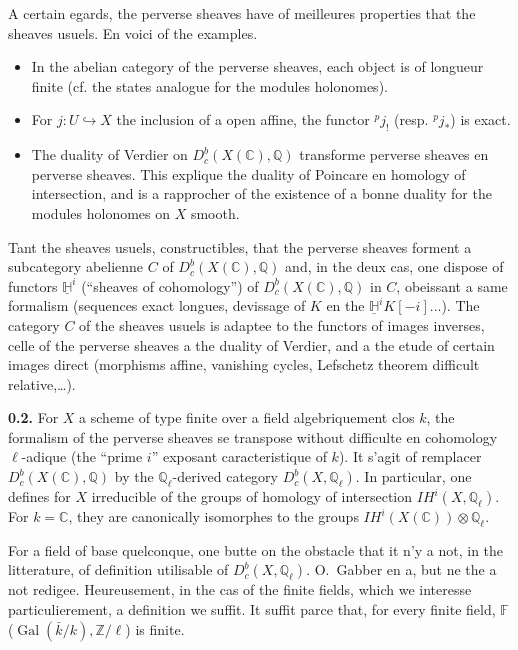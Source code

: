 \documentclass[12pt,a4paper]{article}
\theoremstyle{plain}
\theoremstyle{definition}
\theoremstyle{remark}
\DeclareMathOperator{\Gal}{Gal}
\newcommand{\IH}{\mathit{IH}}
\newcommand{\HH}{\mathbb{H}}
\newcommand{\CC}{\mathbb{C}}
\newcommand{\QQ}{\mathbb{Q}}
\newcommand{\ZZ}{\mathbb{Z}}
\newcommand{\FF}{\mathbb{F}}
\begin{document}
A certain egards, the perverse sheaves have of meilleures properties that the sheaves usuels. En voici of the examples.

\begin{itemize}
\item In the abelian category of the perverse sheaves, each object is of longueur finite (cf. the states analogue for the modules holonomes).
\item For $j : U \hookrightarrow X$ the inclusion of a open affine, the functor ${}^{p}j_{!}$ (resp. ${}^{p}j_{*}$) is exact.
\item The duality of Verdier on $D^{b}_{c}(X(\CC), \QQ)$ transforme perverse sheaves en perverse sheaves. This explique the duality of Poincare en homology of intersection, and is a rapprocher of the existence of a bonne duality for the modules holonomes on $X$ smooth.
\end{itemize}

Tant the sheaves usuels, constructibles, that the perverse sheaves forment a subcategory abelienne $C$ of $D^{b}_{c}(X(\CC), \QQ)$ and, in the deux cas, one dispose of functors $\underline{\HH}^{i}$ (``sheaves of cohomology'') of $D^{b}_{c}(X(\CC), \QQ)$ in $C$, obeissant a same formalism (sequences exact longues, devissage of $K$ en the $\underline{\HH}^{i}K[-i]$...). The category $C$ of the sheaves usuels is adaptee to the functors of images inverses, celle of the perverse sheaves a the duality of Verdier, and a the etude of certain images direct (morphisms affine, vanishing cycles, Lefschetz theorem difficult relative,\ldots).

\medskip

\noindent
\textbf{0.2.} For $X$ a scheme of type finite over a field algebriquement clos $k$, the formalism of the perverse sheaves se transpose without difficulte en cohomology $\ell$-adique (the ``prime $i$'' exposant caracteristique of $k$). It s'agit of remplacer $D^{b}_{c}(X(\CC), \QQ)$ by the $\QQ_{\ell}$-derived category $D^{b}_{c}(X, \QQ_{\ell})$. In particular, one defines for $X$ irreducible of the groups of homology of intersection $\IH^{i}(X, \QQ_{\ell})$. For $k = \CC$, they are canonically isomorphes to the groups $\IH^{i}(X(\CC)) \otimes \QQ_{\ell}$.

For a field of base quelconque, one butte on the obstacle that it n'y a not, in the litterature, of definition utilisable of $D^{b}_{c}(X, \QQ_{\ell})$. O.~Gabber en a, but ne the a not redigee. Heureusement, in the cas of the finite fields, which we interesse particulierement, a definition we suffit. It suffit parce that, for every finite field, $\FF$ ($\Gal(\bar{k}/k), \ZZ/\ell$) is finite.
\end{document}
